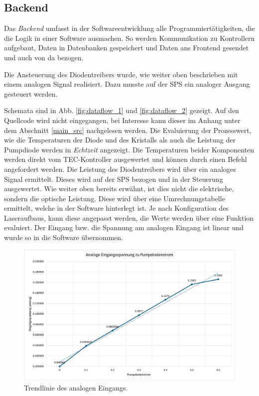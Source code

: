 \subsection{Backend}
\label{chptr:software_backend}
Das \textit{Backend} umfasst in der Softwareentwicklung alle Programmiertätigkeiten, die die Logik in einer Software ausmachen. So werden Kommunikation zu Kontrollern aufgebaut, Daten in Datenbanken gespeichert und Daten ans Frontend gesendet und auch von da bezogen.

Die Ansteuerung des Diodentreibers wurde, wie weiter oben beschrieben mit einem analogen Signal realisiert. Dazu musste auf der SPS ein analoger Ausgang gesteuert werden.

Schemata sind in Abb. \ref{fig:dataflow_1} und \ref{fig:dataflow_2} gezeigt. Auf den Quellcode wird nicht eingegangen, bei Interesse kann dieser im Anhang unter dem Abschnitt \ref{main_src} nachgelesen werden.
Die Evaluierung der Prozesswert, wie die Temperaturen der Diode und des Kristalls als auch die Leistung der Pumpdiode werden in \textit{Echtzeit} angezeigt.
Die Temperaturen beider Komponenten werden direkt vom TEC-Kontroller ausgewertet und können durch einen Befehl angefordert werden.
Die Leistung des Diodentreibers wird über ein analoges Signal ermittelt. Dieses wird auf der SPS bezogen und in der Steuerung ausgewertet. Wie weiter oben bereits erwähnt, ist dies nicht die elektrische, sondern die optische Leistung. Diese wird über eine Umrechnungstabelle ermittelt, welche in der Software hinterlegt ist. Je nach Konfiguration des Laseraufbaus, kann diese angepasst werden, die Werte werden über eine Funktion evaluiert.
Der Eingang bzw. die Spannung am analogen Eingang ist linear und wurde so in die Software übernommen.

\begin{figure}[H]
    \centering
    \includegraphics[scale=0.5]{98_images/analog_eingang_trendline.png}
    \caption{Trendlinie des analogen Eingangs.}
    \label{fig:enter-label}
\end{figure}
